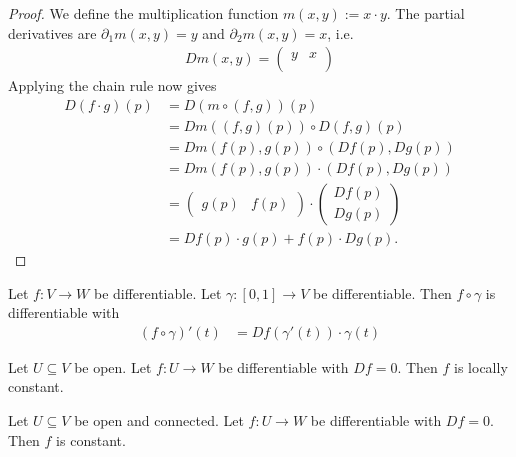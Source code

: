 \begin{proof}
	We define the multiplication function $m(x,y) := x \cdot y$. The partial derivatives are $\partial_1 m(x,y) = y$ and $\partial_2 m(x,y) = x$, i.e.
	\begin{align*}
		Dm(x,y) = 
		\begin{pmatrix}
			y & x\\
		\end{pmatrix}
	\end{align*}
	Applying the chain rule now gives
	\begin{align*}
		D(f \cdot g)(p)
		&=
		D(m \circ (f,g))(p)\\
		&=	
		Dm((f,g)(p)) \circ D(f,g)(p)\\
		&=	
		Dm(f(p), g(p)) \circ (Df(p), Dg(p))\\
		&=	
		Dm(f(p), g(p)) \cdot (Df(p), Dg(p))\\
		&=	
		\begin{pmatrix} 
			g(p) & f(p)
		\end{pmatrix}
		\cdot 
		\begin{pmatrix}
			Df(p)\\
			Dg(p)
		\end{pmatrix}\\
		&= Df(p) \cdot g(p) + f(p) \cdot Dg(p).
	\end{align*}
\end{proof}
\clearpage
\begin{exercise}
	Let $f : V \to W$ be differentiable. Let $\gamma : [0,1] \to V$ be differentiable. Then $f \circ \gamma$ is differentiable with
	\begin{align*}
		(f \circ \gamma)'(t)
		&=
		Df(\gamma'(t)) \cdot \gamma(t)
	\end{align*}
\end{exercise}
\begin{theorem}
	Let $U \subseteq V$ be open. Let $f : U \to W$ be differentiable with $Df = 0$. Then $f$ is locally constant.
\end{theorem}
\begin{corollary}
	Let $U \subseteq V$ be open and connected. Let $f : U \to W$ be differentiable with $Df = 0$. Then $f$ is constant.
\end{corollary}

\clearpage

